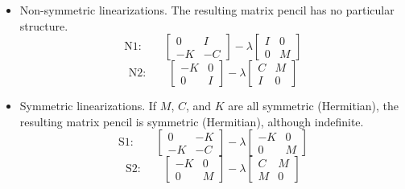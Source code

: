 \begin{itemize}
\item Non-symmetric linearizations. The resulting matrix pencil has no particular structure.
\begin{equation}
\label{eq:n1}
\mbox{N1:}\qquad
\left[\begin{array}{cc}0 & I\\-K & -C\end{array}\right]-\lambda\left[\begin{array}{cc}I & 0\\0 & M\end{array}\right]
\end{equation}
\begin{equation}
\label{eq:n2}
\mbox{N2:}\qquad
\left[\begin{array}{cc}-K & 0\\0 & I\end{array}\right]-\lambda\left[\begin{array}{cc}C & M\\I & 0\end{array}\right]
\end{equation}

\medskip
\item Symmetric linearizations. If $M$, $C$, and $K$ are all symmetric (Hermitian), the resulting matrix pencil is symmetric (Hermitian), although indefinite.
\begin{equation}
\label{eq:s1}
\mbox{S1:}\qquad
\left[\begin{array}{cc}0 & -K\\-K & -C\end{array}\right]-\lambda\left[\begin{array}{cc}-K & 0\\0 & M\end{array}\right]
\end{equation}
\begin{equation}
\label{eq:s2}
\mbox{S2:}\qquad
\left[\begin{array}{cc}-K & 0\\0 & M\end{array}\right]-\lambda\left[\begin{array}{cc}C & M\\ M & 0\end{array}\right]
\end{equation}


\end{itemize}

